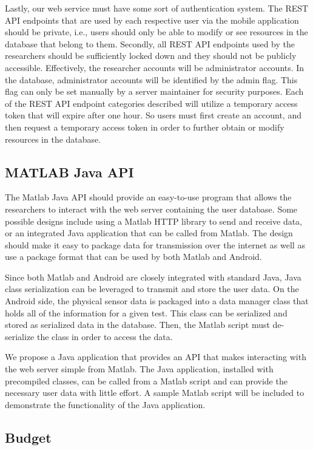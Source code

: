 \documentclass[conference]{IEEEtran}
\begin{document}
Lastly, our web service must have some sort of authentication system. The REST API endpoints that are used by each respective user via the mobile application should be private, i.e., users should only be able to modify or see resources in the database that belong to them. Secondly, all REST API endpoints used by the researchers should be sufficiently locked down and they should not be publicly accessible. Effectively, the researcher accounts will be administrator accounts. In the database, administrator accounts will be identified by the admin flag. This flag can only be set manually by a server maintainer for security purposes. Each of the REST API endpoint categories described will utilize a temporary access token that will expire after one hour. So users must first create an account, and then request a temporary access token in order to further obtain or modify resources in the database.

\subsection{MATLAB Java API}
The Matlab Java API should provide an easy-to-use program that allows the researchers to interact with the web server containing the user database. Some possible designs include using a Matlab HTTP library to send and receive data, or an integrated Java application that can be called from Matlab. The design should make it easy to package data for transmission over the internet as well as use a package format that can be used by both Matlab and Android. 

Since both Matlab and Android are closely integrated with standard Java, Java class serialization can be leveraged to transmit and store the user data. On the Android side, the physical sensor data is packaged into a data manager class that holds all of the information for a given test. This class can be serialized and stored as serialized data in the database. Then, the Matlab script must de-serialize the class in order to access the data. 

We propose a Java application that provides an API that makes interacting with the web server simple from Matlab. The Java application, installed with precompiled classes, can be called from a Matlab script and can provide the necessary user data with little effort. A sample Matlab script will be included to demonstrate the functionality of the Java application.

\subsection{Budget}
\end{document}
